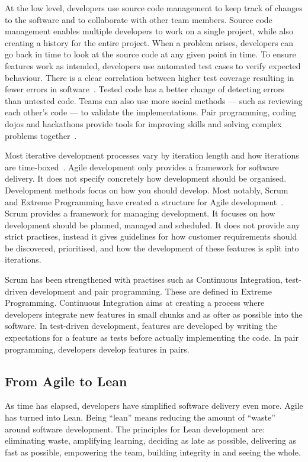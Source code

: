 \documentclass[english]{tktltiki2}
\begin{document}
At the low level, developers use source code management to keep track of changes to the software and to collaborate with other team members. Source code management enables multiple developers to work on a single project, while also creating a history for the entire project. When a problem arises, developers can go back in time to look at the source code at any given point in time. To ensure features work as intended, developers use automated test cases to verify expected behaviour. There is a clear correlation between higher test coverage resulting in fewer errors in software~\cite{MND09}. Tested code has a better change of detecting errors than untested code. Teams can also use more social methods — such as reviewing each other’s code — to validate the implementations. Pair programming, coding dojos and hackathons provide tools for improving skills and solving complex problems together~\cite{HHL13}.

Most iterative development processes vary by iteration length and how iterations are time-boxed~\cite{LB03}. Agile development only provides a framework for software delivery. It does not specify concretely how development should be organised. Development methods focus on how you should develop. Most notably, Scrum and Extreme Programming have created a structure for Agile development~\cite{LB03, Fow05, SS10}. Scrum provides a framework for managing development. It focuses on how development should be planned, managed and scheduled. It does not provide any strict practises, instead it gives guidelines for how customer requirements should be discovered, prioritised, and how the development of these features is split into iterations.

Scrum has been strengthened with practises such as Continuous Integration, test-driven development and pair programming. These are defined in Extreme Programming. Continuous Integration aims at creating a process where developers integrate new features in small chunks and as ofter as possible into the software. In test-driven development, features are developed by writing the expectations for a feature as tests before actually implementing the code. In pair programming, developers develop features in pairs.

\subsection{From Agile to Lean}

As time has elapsed, developers have simplified software delivery even more. Agile has turned into Lean. Being “lean” means reducing the amount of “waste” around software development. The principles for Lean development are: eliminating waste, amplifying learning, deciding as late as possible, delivering as fast as possible, empowering the team, building integrity in and seeing the whole.
\end{document}
